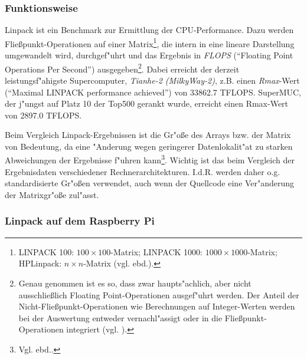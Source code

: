 


\subsubsection{Funktionsweise}\label{Funktionsweise Linpack}

Linpack ist ein Benchmark zur Ermittlung der CPU-Performance. Dazu werden Flie\ss punkt-Operationen auf einer Matrix\footnote{LINPACK 100: $100 \times 100$-Matrix; LINPACK 1000: $1000\times 1000$-Matrix; HPLinpack: $n\times n$-Matrix (vgl. ebd.).}, die intern in eine lineare Darstellung umgewandelt wird, durchgef"uhrt und das Ergebnis in \textit{FLOPS} ("`Floating Point Operations Per Second"') ausgegeben\footnote{Genau genommen ist es so, dass zwar haupts"achlich, aber nicht ausschlie\ss lich Floating Point-Operationen ausgef"uhrt werden. Der Anteil der Nicht-Flie\ss punkt-Operationen wie Berechnungen auf Integer-Werten werden bei der Auswertung entweder vernachl"assigt oder in die Flie\ss punkt-Operationen integriert (vgl. \cite{wei90}).}. Dabei erreicht der derzeit leistungsf"ahigste Supercomputer, \textit{Tianhe-2 (MilkyWay-2)}, z.B. einen \textit{Rmax}-Wert ("`Maximal LINPACK performance achieved"') von 33862.7 TFLOPS. SuperMUC, der j"ungst auf Platz 10 der Top500 gerankt wurde, erreicht einen Rmax-Wert von 2897.0 TFLOPS.

Beim Vergleich Linpack-Ergebnissen ist die Gr"o\ss e des Arrays bzw. der Matrix von Bedeutung, da eine "Anderung wegen geringerer Datenlokalit"at zu starken Abweichungen der Ergebnisse f"uhren kann\footnote{Vgl. ebd..}. Wichtig ist das beim Vergleich der Ergebnisdaten verschiedener Rechnerarchitekturen. I.d.R. werden daher o.g. standardisierte Gr"o\ss en verwendet, auch wenn der Quellcode eine Ver"anderung der Matrixgr"o\ss e zul"asst. 

\subsubsection{Linpack auf dem Raspberry Pi}\label{Linpack RPi}


